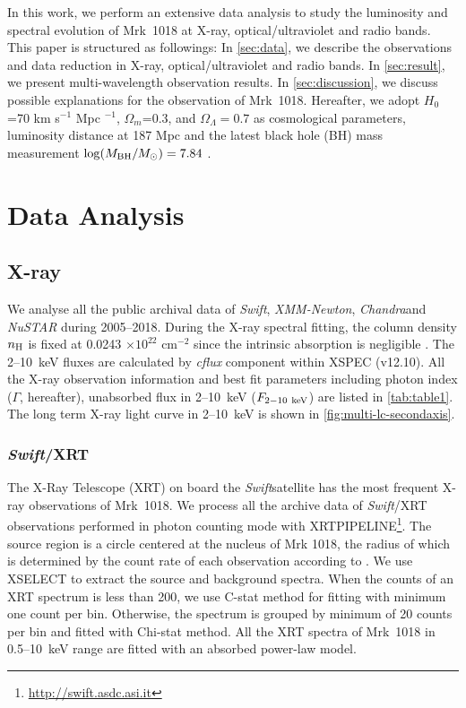 \documentclass[twocolumn]{aastex63}
\newcommand{\xmm}{{\em XMM-Newton}}
\newcommand{\nustar}{{\em NuSTAR }}
\newcommand{\chandra}{{\em Chandra}}
\newcommand{\swift}{{\em Swift}}
\begin{document}
In this work, we perform an extensive data analysis to study the luminosity and spectral evolution of Mrk~1018 at X-ray, optical/ultraviolet and radio bands. This paper is structured as followings: In \autoref{sec:data}, we describe the observations and data reduction in X-ray, optical/ultraviolet and radio bands. In \autoref{sec:result}, we present multi-wavelength observation results. In \autoref{sec:discussion}, we discuss possible explanations for the observation of Mrk~1018. Hereafter, we adopt $H_0$=70 km s$^{-1}$ Mpc $^{-1}$, $\Omega_{m}$=0.3, and $\Omega_{\Lambda}=0.7 $ as cosmological parameters, luminosity distance at 187 Mpc and the latest black hole (BH) mass measurement $\log(M_{\rm{BH}}/M_{\odot})=7.84$ \citep{2017MNRAS.472.3492E,2018MNRAS.480.3898N}. 


\section{Data Analysis}\label{sec:data}
\subsection{X-ray}
We analyse all the public archival data of \swift, \xmm, \chandra and \nustar during 2005--2018. During the X-ray spectral fitting, the column density $n_{\rm{H}}$ is fixed at 0.0243 $\times 10^{22}$ cm$^{-2}$ since the intrinsic absorption is negligible \citep[see ][]{2016A&A...593L...9H}. The 2--10~keV fluxes are calculated by {\it cflux} component within {\scriptsize XSPEC} (v12.10). All the X-ray observation information and best fit parameters including photon index ($\Gamma$, hereafter), unabsorbed flux in 2--10~keV ($F_{\rm{2-10~keV}}$) are listed in \autoref{tab:table1}. The long term X-ray light curve in 2--10~keV is shown in \autoref{fig:multi-lc-secondaxis}.


\subsubsection{\swift/XRT}
The X-Ray Telescope (XRT) on board the \swift satellite has the most frequent X-ray observations of Mrk~1018. We process all the archive data of \swift/XRT observations performed in photon counting mode with {\scriptsize XRTPIPELINE}\footnote{\url{http://swift.asdc.asi.it}}. The source region is a circle centered at the nucleus of Mrk 1018, the radius of which is determined by the count rate of each observation according to \citet{2009MNRAS.397.1177E}. We use {\scriptsize XSELECT} to extract the source and background spectra. When the counts of an XRT spectrum is less than 200, we use C-stat method for fitting with minimum one count per bin. Otherwise, the spectrum is grouped by minimum of 20 counts per bin and fitted with Chi-stat method. All the XRT spectra of Mrk~1018 in 0.5--10~keV range are fitted with an absorbed power-law model. 
\end{document}

